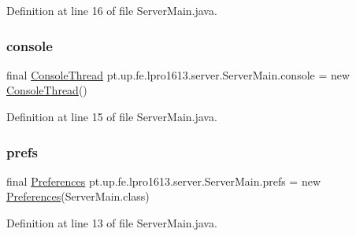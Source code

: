 Definition at line 16 of file Server\+Main.\+java.

\hypertarget{classpt_1_1up_1_1fe_1_1lpro1613_1_1server_1_1_server_main_af9f54f997c78d9974b788b66d05c4c2c}{}\label{classpt_1_1up_1_1fe_1_1lpro1613_1_1server_1_1_server_main_af9f54f997c78d9974b788b66d05c4c2c} 
\subsubsection{\texorpdfstring{console}{console}}
{\footnotesize\ttfamily final \hyperlink{classpt_1_1up_1_1fe_1_1lpro1613_1_1server_1_1other_1_1_console_thread}{Console\+Thread} pt.\+up.\+fe.\+lpro1613.\+server.\+Server\+Main.\+console = new \hyperlink{classpt_1_1up_1_1fe_1_1lpro1613_1_1server_1_1other_1_1_console_thread}{Console\+Thread}()\hspace{0.3cm}{\ttfamily [static]}}



Definition at line 15 of file Server\+Main.\+java.

\hypertarget{classpt_1_1up_1_1fe_1_1lpro1613_1_1server_1_1_server_main_af70c93d4f50a3f81c9edb159095f6b1c}{}\label{classpt_1_1up_1_1fe_1_1lpro1613_1_1server_1_1_server_main_af70c93d4f50a3f81c9edb159095f6b1c} 
\subsubsection{\texorpdfstring{prefs}{prefs}}
{\footnotesize\ttfamily final \hyperlink{classpt_1_1up_1_1fe_1_1lpro1613_1_1sharedlib_1_1utils_1_1_preferences}{Preferences} pt.\+up.\+fe.\+lpro1613.\+server.\+Server\+Main.\+prefs = new \hyperlink{classpt_1_1up_1_1fe_1_1lpro1613_1_1sharedlib_1_1utils_1_1_preferences}{Preferences}(Server\+Main.\+class)\hspace{0.3cm}{\ttfamily [static]}}



Definition at line 13 of file Server\+Main.\+java.

\hypertarget{classpt_1_1up_1_1fe_1_1lpro1613_1_1server_1_1_server_main_a47b0d3f323dca42ff790cf040be6ce3a}{}\label{classpt_1_1up_1_1fe_1_1lpro1613_1_1server_1_1_server_main_a47b0d3f323dca42ff790cf040be6ce3a} 
